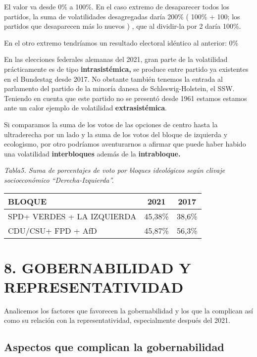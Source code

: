 \documentclass[
]{article}
\begin{document}
El valor va desde 0\% a 100\%. En el caso extremo de desaparecer todos
los partidos, la suma de volatilidades desagregadas daría 200\% ( 100\%
+ 100; los partidos que desaparecen más lo nuevos ) , que al dividir-la
por 2 daría 100\%.

En el otro extremo tendríamos un resultado electoral idéntico al
anterior: 0\%

En las elecciones federales alemanas del 2021, gran parte de la
volatilidad prácticamente es de tipo \textbf{intrasistémica,} se produce
entre partido ya existentes en el Bundestag desde 2017. No obstante
también tenemos la entrada al parlamento del partido de la minoría
danesa de Schleswig-Holstein, el SSW. Teniendo en cuenta que este
partido no se presentó desde 1961 estamos estamos ante un calor ejemplo
de volatilidad \textbf{extrasistémica}.

Si comparamos la suma de los votos de las opciones de centro hasta la
ultraderecha por un lado y la suma de los votos del bloque de izquierda
y ecologismo, por otro podríamos aventurarnos a afirmar que puede haber
habido una volatilidad \textbf{interbloques} además de la
\textbf{intrabloque.}

\emph{Tabla5. Suma de porcentajes de voto por bloques ideológicos según
clivaje socioeconómico ``Derecha-Izquierda''.}

\begin{longtable}[]{@{}lcc@{}}
\toprule\noalign{}
\textbf{BLOQUE} & \textbf{2021} & \textbf{2017} \\
\midrule\noalign{}
\endhead
\bottomrule\noalign{}
\endlastfoot
SPD+ VERDES + LA IZQUIERDA & 45,38\% & 38,6\% \\
CDU/CSU+ FPD + AfD & 45,87\% & 56,3\% \\
\end{longtable}

\hypertarget{gobernabilidad-y-representatividad}{%
\section{8. GOBERNABILIDAD Y
REPRESENTATIVIDAD}\label{gobernabilidad-y-representatividad}}

Analicemos los factores que favorecen la gobernabilidad y los que la
complican así como su relación con la representatividad, especialmente
después del 2021.

\hypertarget{aspectos-que-complican-la-gobernabilidad}{%
\subsection{Aspectos que complican la
gobernabilidad}\label{aspectos-que-complican-la-gobernabilidad}}
\end{document}
